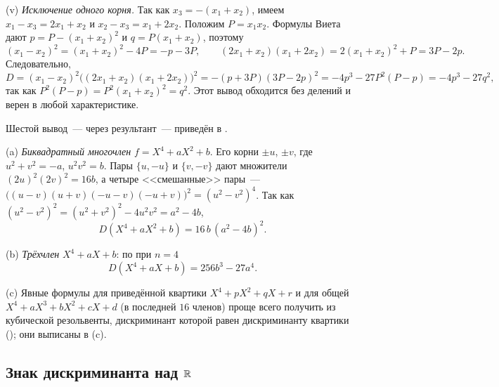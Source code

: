 \begin{example}[4.2e: пять выводов формулы $D(X^3+pX+q)=-4p^3-27q^2$]
(v) \emph{Исключение одного корня.} Так как $x_3=-(x_1+x_2)$, имеем $x_1-x_3=2x_1+x_2$ и $x_2-x_3=x_1+2x_2$. Положим
$P=x_1x_2$. Формулы Виета дают $p=P-(x_1+x_2)^2$ и $q=P(x_1+x_2)$, поэтому
\[
(x_1-x_2)^2=(x_1+x_2)^2-4P=-p-3P,\qquad (2x_1+x_2)(x_1+2x_2)=2(x_1+x_2)^2+P=3P-2p .
\]
Следовательно,
\[
D=(x_1-x_2)^2\bigl((2x_1+x_2)(x_1+2x_2)\bigr)^2=-(p+3P)(3P-2p)^2=-4p^3-27P^2(P-p)=-4p^3-27q^2,
\]
так как $P^2(P-p)=P^2(x_1+x_2)^2=q^2$. Этот вывод обходится без делений и верен в любой характеристике.

Шестой вывод~--- через результант~--- приведён в .
\end{example}

\begin{example}
(a) \emph{Биквадратный многочлен} $f=X^4+aX^2+b$. Его корни $\pm u$, $\pm v$, где $u^2+v^2=-a$, $u^2v^2=b$. Пары $\{u,-u\}$ и
$\{v,-v\}$ дают множители $(2u)^2(2v)^2=16b$, а четыре <<смешанные>> пары~--- $\bigl((u-v)(u+v)(-u-v)(-u+v)\bigr)^2=(u^2-v^2)^4$.
Так как $(u^2-v^2)^2=(u^2+v^2)^2-4u^2v^2=a^2-4b$,
\[
D(X^4+aX^2+b)=16\,b\,(a^2-4b)^2 .
\]

(b) \emph{Трёхчлен} $X^4+aX+b$: по  при $n=4$
\[
D(X^4+aX+b)=256b^3-27a^4 .
\]

(c) Явные формулы для приведённой квартики $X^4+pX^2+qX+r$ и для общей $X^4+aX^3+bX^2+cX+d$ (в последней
$16$ членов) проще всего получить из кубической резольвенты, дискриминант которой равен дискриминанту квартики
(); они выписаны в (c).
\end{example}

\subsection*{Знак дискриминанта над $\mathbb R$}


